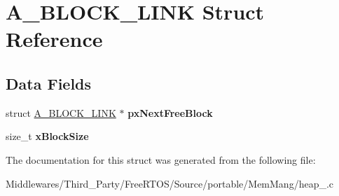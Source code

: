 \hypertarget{struct_a___b_l_o_c_k___l_i_n_k}{}\section{A\+\_\+\+B\+L\+O\+C\+K\+\_\+\+L\+I\+NK Struct Reference}
\label{struct_a___b_l_o_c_k___l_i_n_k}
\subsection*{Data Fields}
\begin{DoxyCompactItemize}
\item 
\mbox{\label{struct_a___b_l_o_c_k___l_i_n_k_ae48282896c5b0af5cb25f914f3c1c936}} 
struct \mbox{\hyperlink{struct_a___b_l_o_c_k___l_i_n_k}{A\+\_\+\+B\+L\+O\+C\+K\+\_\+\+L\+I\+NK}} $\ast$ {\bfseries px\+Next\+Free\+Block}
\item 
\mbox{\label{struct_a___b_l_o_c_k___l_i_n_k_a130b4f85ad4cc46ca0f3d36001769696}} 
size\+\_\+t {\bfseries x\+Block\+Size}
\end{DoxyCompactItemize}


The documentation for this struct was generated from the following file\+:\begin{DoxyCompactItemize}
\item 
Middlewares/\+Third\+\_\+\+Party/\+Free\+R\+T\+O\+S/\+Source/portable/\+Mem\+Mang/heap\+\_.\+c\end{DoxyCompactItemize}
